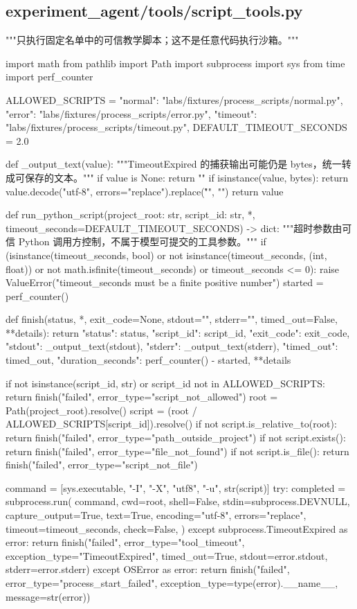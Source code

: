 \subsection{experiment\_agent/tools/script\_tools.py}

\begin{Code}
"""只执行固定名单中的可信教学脚本；这不是任意代码执行沙箱。"""

import math
from pathlib import Path
import subprocess
import sys
from time import perf_counter


ALLOWED_SCRIPTS = {
    "normal": "labs/fixtures/process_scripts/normal.py",
    "error": "labs/fixtures/process_scripts/error.py",
    "timeout": "labs/fixtures/process_scripts/timeout.py",
}
DEFAULT_TIMEOUT_SECONDS = 2.0


def _output_text(value):
    """TimeoutExpired 的捕获输出可能仍是 bytes，统一转成可保存的文本。"""
    if value is None:
        return ""
    if isinstance(value, bytes):
        return value.decode("utf-8", errors="replace").replace("\r\n", "\n")
    return value


def run_python_script(project_root: str, script_id: str, *, timeout_seconds=DEFAULT_TIMEOUT_SECONDS) -> dict:
    """超时参数由可信 Python 调用方控制，不属于模型可提交的工具参数。"""
    if (isinstance(timeout_seconds, bool) or not isinstance(timeout_seconds, (int, float))
            or not math.isfinite(timeout_seconds) or timeout_seconds <= 0):
        raise ValueError("timeout_seconds must be a finite positive number")
    started = perf_counter()

    def finish(status, *, exit_code=None, stdout="", stderr="", timed_out=False, **details):
        return {"status": status, "script_id": script_id, "exit_code": exit_code,
                "stdout": _output_text(stdout), "stderr": _output_text(stderr),
                "timed_out": timed_out, "duration_seconds": perf_counter() - started,
                **details}

    if not isinstance(script_id, str) or script_id not in ALLOWED_SCRIPTS:
        return finish("failed", error_type="script_not_allowed")
    root = Path(project_root).resolve()
    script = (root / ALLOWED_SCRIPTS[script_id]).resolve()
    if not script.is_relative_to(root):
        return finish("failed", error_type="path_outside_project")
    if not script.exists():
        return finish("failed", error_type="file_not_found")
    if not script.is_file():
        return finish("failed", error_type="script_not_file")

    command = [sys.executable, "-I", "-X", "utf8", "-u", str(script)]
    try:
        completed = subprocess.run(
            command, cwd=root, shell=False, stdin=subprocess.DEVNULL,
            capture_output=True, text=True, encoding="utf-8", errors="replace",
            timeout=timeout_seconds, check=False,
        )
    except subprocess.TimeoutExpired as error:
        return finish("failed", error_type="tool_timeout", exception_type="TimeoutExpired",
                      timed_out=True, stdout=error.stdout, stderr=error.stderr)
    except OSError as error:
        return finish("failed", error_type="process_start_failed",
                      exception_type=type(error).__name__, message=str(error))


\end{Code}
